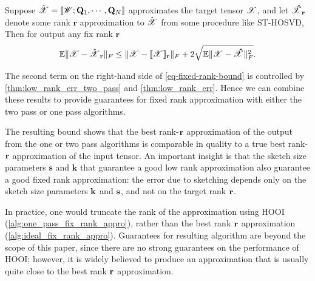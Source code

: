 \begin{thm}
\label{thm:fix_rank_err}
Suppose $\hat{\T{X}} = \llbracket \T{W}; \mathbf{Q}_1,\cdots, \mathbf{Q}_N \rrbracket$
approximates the target tensor $\T{X}$, %
and let $\T{\hat{X}}_\V{r}$ denote some rank $\mathbf{r}$ approximation to $\hat{\T{X}}$ from some procedure like ST-HOSVD,
Then for output  any fix rank $\mathbf{r}$
\begin{equation*} \label{eq-fixed-rank-bound}
\mathbb{E} \|\T{X} - \hat{\T{X}}_{\V{r}} \|_F \le
\|\T{X} - \llbracket \T{X}\rrbracket_\mathbf{r}\|_F
+2\sqrt{\mathbb{E}\|\T{X}-\T{\hat{X}}\|_F^2}.
\end{equation*}
\end{thm}

The second term on the right-hand side of \ref{eq-fixed-rank-bound}
is controlled by \ref{thm:low_rank_err_two_pass} and \ref{thm:low_rank_err}.
Hence we can combine these results
to provide guarantees for fixed rank approximation with either the
two pass or one pass algorithms.


The resulting bound shows that the best rank-$\mathbf{r}$
approximation of the output from the one or two pass algorithms
is comparable in quality to a true best rank-$\mathbf{r}$ approximation of the input tensor.
An important insight %
is that the sketch size parameters $\mathbf{s}$ and $\mathbf{k}$
that guarantee a good low rank approximation
also guarantee a good fixed rank approximation:
the error due to sketching depends only
on the sketch size parameters $\mathbf{k}$ and $\mathbf{s}$,
and not on the target rank $\mathbf{r}$.


In practice, one would truncate the rank of the approximation using
HOOI (\ref{alg:one_pass_fix_rank_appro}),
rather than the best rank $\mathbf{r}$ approximation (\ref{alg:ideal_fix_rank_appro}).
Guarantees for resulting algorithm are beyond the scope of this paper,
since there are no strong guarantees on the performance of HOOI;
however, it is widely believed to produce an approximation that is usually
quite close to the best rank $\mathbf{r}$ approximation.

